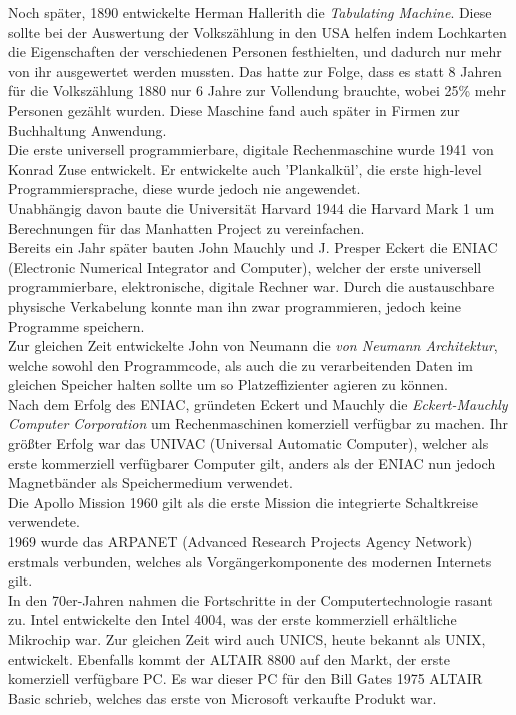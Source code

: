 \documentclass{article}
\begin{document}
	Noch später, 1890 entwickelte Herman Hallerith die \textit{Tabulating Machine}. Diese sollte bei der Auswertung der Volkszählung in den USA helfen indem Lochkarten die Eigenschaften der verschiedenen Personen festhielten, und dadurch nur mehr von ihr ausgewertet werden mussten. Das hatte zur Folge, dass es statt 8 Jahren für die Volkszählung 1880 nur 6 Jahre zur Vollendung brauchte, wobei 25\% mehr Personen gezählt wurden. Diese Maschine fand auch später in Firmen zur Buchhaltung Anwendung. \\
	Die erste universell programmierbare, digitale Rechenmaschine wurde 1941 von Konrad Zuse entwickelt. Er entwickelte auch 'Plankalkül', die erste high-level Programmiersprache, diese wurde jedoch nie angewendet. \\
	Unabhängig davon baute die Universität Harvard 1944 die Harvard Mark 1 um Berechnungen für das Manhatten Project zu vereinfachen. \\
	Bereits ein Jahr später bauten John Mauchly und J. Presper Eckert die ENIAC (Electronic Numerical Integrator and Computer), welcher der erste universell programmierbare, elektronische, digitale Rechner war. Durch die austauschbare physische Verkabelung konnte man ihn zwar programmieren, jedoch keine Programme speichern. \\
	Zur gleichen Zeit entwickelte John von Neumann die \textit{von Neumann Architektur}, welche sowohl den Programmcode, als auch die zu verarbeitenden Daten im gleichen Speicher halten sollte um so Platzeffizienter agieren zu können. \\
	Nach dem Erfolg des ENIAC, gründeten Eckert und Mauchly die \textit{Eckert-Mauchly Computer Corporation} um Rechenmaschinen komerziell verfügbar zu machen. Ihr größter Erfolg war das UNIVAC (Universal Automatic Computer), welcher als erste kommerziell verfügbarer Computer gilt, anders als der ENIAC nun jedoch Magnetbänder als Speichermedium verwendet.\\
	Die Apollo Mission 1960 gilt als die erste Mission die integrierte Schaltkreise verwendete. \\
	1969 wurde das ARPANET (Advanced Research Projects Agency Network) erstmals verbunden, welches als Vorgängerkomponente des modernen Internets gilt. \\
	In den 70er-Jahren nahmen die Fortschritte in der Computertechnologie rasant zu. Intel entwickelte den Intel 4004, was der erste kommerziell erhältliche Mikrochip war. Zur gleichen Zeit wird auch UNICS, heute bekannt als UNIX, entwickelt. Ebenfalls kommt der ALTAIR 8800 auf den Markt, der erste komerziell verfügbare PC. Es war dieser PC für den Bill Gates 1975 ALTAIR Basic schrieb, welches das erste von Microsoft verkaufte Produkt war.
\end{document}
